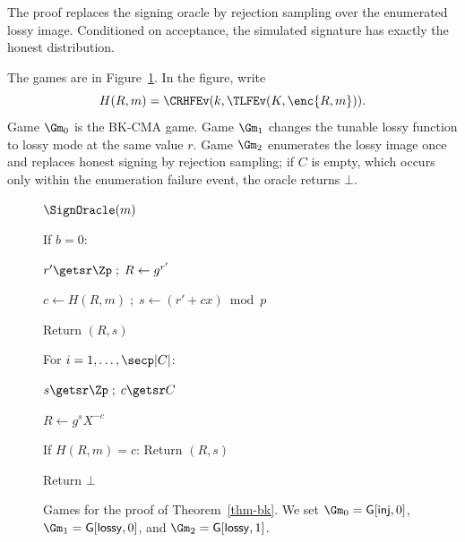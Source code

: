 The proof replaces the signing oracle by rejection sampling over the enumerated lossy image. Conditioned on acceptance, the simulated signature has exactly the honest distribution.

The games are in Figure~\ref{fig-bk-games}. In the figure, write
$$
H(R,m)=\CRHFEv(k,\TLFEv(K,\enc{R,m})).
$$
Game $\Gm_0$ is the BK-CMA game. Game $\Gm_1$ changes the tunable lossy function to lossy mode at the same value $r$. Game $\Gm_2$ enumerates the lossy image once and replaces honest signing by rejection sampling; if $C$ is empty, which occurs only within the enumeration failure event, the oracle returns $\bot$.

\begin{figure}[t]
{
\begin{oracle}{$\SignOracle(m)$}
\item If $b=0$:
\item \quad $r'\getsr\Zp\;;\;R\gets g^{r'}$
\item \quad $c\gets H(R,m)\;;\;s\gets(r'+cx)\bmod p$
\item \quad Return $(R,s)$
\item For $i=1,\ldots,\secp|C|$:
\item \quad $s\getsr\Zp\;;\;c\getsr C$
\item \quad $R\gets g^sX^{-c}$
\item \quad If $H(R,m)=c$: Return $(R,s)$
\item Return $\bot$
\end{oracle}
}
\vspace{-12pt}
\caption{Games for the proof of Theorem~\ref{thm-bk}. We set $\Gm_0=\mathsf{G}[\mathsf{inj},0]$, $\Gm_1=\mathsf{G}[\mathsf{lossy},0]$, and $\Gm_2=\mathsf{G}[\mathsf{lossy},1]$.}\label{fig-bk-games}
\vspace{-3pt}\hrulefill
\vspace{-1ex}
\end{figure}

